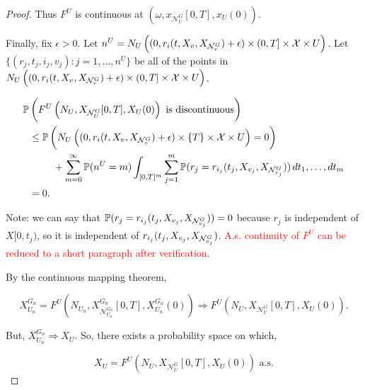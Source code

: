 \documentclass[12pt]{article}
\newcommand{\mb}{\mathbb}
\newcommand{\mc}{\mathcal}
\newcommand{\te}{\text}
\newcommand{\ep}{\epsilon}
\newcommand{\tr}{\textcolor{red}}
\newcommand{\ind}{\hspace{24pt}}
\newcommand{\pr}{\mb{P}}							%
\newcommand{\sta}{\mc{X}}							%
\newcommand{\gneigh}[2]{\mc{N}^{#1}_{#2}}			%
\newcommand{\Xf}{X}									%
\newcommand{\poiss}{N}								%
\newcommand{\rate}{r}								%
\newcommand{\xf}{x}									%
\newcommand{\dpoiss}{\omega}						%
\newcommand{\poissv}[1]{_{#1}}						%
\newcommand{\vind}[1]{_{#1}}						%
\newcommand{\tme}[1]{(#1)}							%
\newcommand{\tmi}[1]{#1}							%
\newcommand{\gind}[1]{^{#1}}						%
\newcommand{\vpara}[1]{^{#1}}						%
\newcommand{\stpara}[1]{_{#1}}						%
\newcommand{\tmepro}[3]{
\ifstrempty{#3}{
	(#1,#2)}{
	(#1,#2,#3)}}									%
\newcommand{\ptsnum}{n}								%
\renewcommand{\it}[1]{_{#1}}						%
\begin{document}
\begin{proof}
Thus \(F\vpara{U}\) is continuous at \((\dpoiss,\xf\vind{\gneigh{G}{U}}\tmi{[0,T]}, \xf\vind{U}\tme{0})\). 

\ind Finally, fix \(\ep > 0\). Let \(\ptsnum\vpara{U} = \poiss\poissv{U}\left((0,\rate\stpara{i}\tmepro{t}{\Xf\vind{v}}{\Xf\vind{\gneigh{G}{v}}}+\ep)\times (0,T] \times \sta \times U\right)\). Let \(\{(r\it{j},t\it{j},i\it{j},v\it{j}):j=1,\dots,\ptsnum\vpara{U}\}\) be all of the points in \(\poiss\poissv{U}\left((0,\rate\stpara{i}\tmepro{t}{\Xf\vind{v}}{\Xf\vind{\gneigh{G}{v}}}+\ep)\times (0,T] \times \sta \times U\right)\).

\begin{align*}
\pr&\left(F\vpara{U}\left(\poiss\poissv{U},\Xf\vind{\gneigh{G}{U}}\tmi{[0,T]},\Xf\vind{U}\tme{0}\right)\te{ is discontinuous}\right)\\
&\leq \pr\left(\poiss\poissv{U}\left((0,\rate\stpara{i}\tmepro{t}{\Xf\vind{v}}{\Xf\vind{\gneigh{G}{v}}} + \ep)\times \{T\} \times \sta\times U\right)=0\right) \\
&\hspace{24 pt}+ \sum_{m=0}^\infty \pr(\ptsnum\vpara{U} = m)\int_{[0,T]^m} \sum_{j=1}^m \pr(r\it{j} = \rate\stpara{i\it{j}}\tmepro{t\it{j}}{\Xf\vind{v\it{j}}}{\Xf\vind{\gneigh{G}{v\it{j}}}})\,dt\it{1},\dots,dt\it{m}\\
&=0.
\end{align*}

Note: we can say that \(\pr(r\it{j} = \rate\stpara{i\it{j}}\tmepro{t\it{j}}{\Xf\vind{v\it{j}}}{\Xf\vind{\gneigh{G}{v\it{j}}}}) = 0\) because \(r\it{j}\) is independent of \(\Xf\tmi{[0,t\it{j})}\), so it is independent of \(\rate\stpara{i\it{j}}\tmepro{t\it{j}}{\Xf\vind{v\it{j}}}{\Xf\vind{\gneigh{G}{v\it{j}}}}\). \tr{A.s. continuity of \(F^U\) can be reduced to a short paragraph after verification.}

\ind By the continuous mapping theorem, 

\[\Xf\gind{G\it{n}}\vind{U\it{n}} = F\vpara{U}\left(\poiss\poissv{U\it{n}},\Xf\gind{G\it{n}}\vind{\gneigh{G\it{n}}{U\it{n}}}\tmi{[0,T]},\Xf\gind{G\it{n}}\vind{U\it{n}}\tme{0}\right) \Rightarrow F\vpara{U}\left(\poiss\poissv{U},\Xf\vind{\gneigh{G}{U}}\tmi{[0,T]},\Xf\vind{U}\tme{0}\right).\]

But, \(\Xf\gind{G\it{n}}\vind{U\it{n}} \Rightarrow \Xf\vind{U}\). So, there exists a probability space on which,

\[\Xf\vind{U} = F\vpara{U}\left(\poiss\poissv{U},\Xf\vind{\gneigh{G}{U}}\tmi{[0,T]},\Xf\vind{U}\tme{0}\right)\te{ a.s.}\]


\end{proof}
\end{document}
